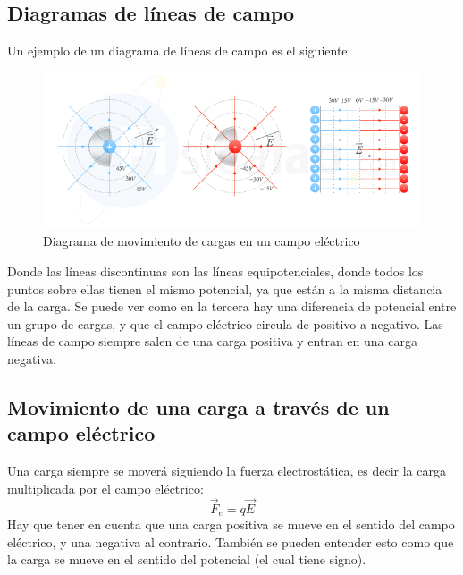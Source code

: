 \documentclass[arial,a4paper,print]{article}
\begin{document}
\subsection{Diagramas de líneas de campo}
Un ejemplo de un diagrama de líneas de campo es el siguiente:
\begin{figure}[H]
	\centering
	\includegraphics[width=0.6\linewidth]{figures/potencial-e-intensidad}
	\caption{Diagrama de movimiento de cargas en un campo eléctrico}
	\label{fig:potencial-e-intensidad}
\end{figure}
Donde las líneas discontinuas son las líneas equipotenciales, donde todos los puntos sobre ellas tienen el mismo potencial, ya que están a la misma distancia de la carga. Se puede ver como en la tercera hay una diferencia de potencial entre un grupo de cargas, y que el campo eléctrico circula de positivo a negativo. Las líneas de campo siempre salen de una carga positiva y entran en una carga negativa.

\subsection{Movimiento de una carga a través de un campo eléctrico}
Una carga siempre se moverá siguiendo la fuerza electrostática, es decir la carga multiplicada por el campo eléctrico:
\begin{equation*}
	\vec{F}_{e} = q\vec{E}
\end{equation*}
Hay que tener en cuenta que una carga positiva se mueve en el sentido del campo eléctrico, y una negativa al contrario. También se pueden entender esto como que la carga se mueve en el sentido del potencial (el cual tiene signo). 
\end{document}
